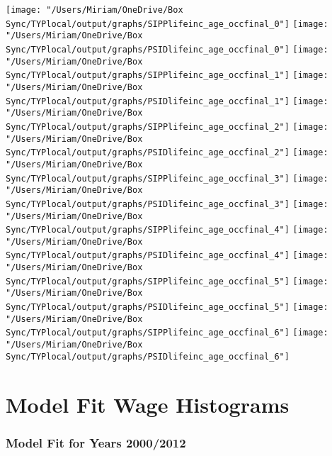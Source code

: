 \documentclass[11pt]{article}
\begin{document}
\begin{center}
\clearpage
\texttt{[image: "/Users/Miriam/OneDrive/Box Sync/TYPlocal/output/graphs/SIPPlifeinc\_age\_occfinal\_0"]}
\newline
\texttt{[image: "/Users/Miriam/OneDrive/Box Sync/TYPlocal/output/graphs/PSIDlifeinc\_age\_occfinal\_0"]}
\clearpage
\texttt{[image: "/Users/Miriam/OneDrive/Box Sync/TYPlocal/output/graphs/SIPPlifeinc\_age\_occfinal\_1"]}
\newline
\texttt{[image: "/Users/Miriam/OneDrive/Box Sync/TYPlocal/output/graphs/PSIDlifeinc\_age\_occfinal\_1"]}
\clearpage
\texttt{[image: "/Users/Miriam/OneDrive/Box Sync/TYPlocal/output/graphs/SIPPlifeinc\_age\_occfinal\_2"]}
\newline
\texttt{[image: "/Users/Miriam/OneDrive/Box Sync/TYPlocal/output/graphs/PSIDlifeinc\_age\_occfinal\_2"]}
\clearpage
\texttt{[image: "/Users/Miriam/OneDrive/Box Sync/TYPlocal/output/graphs/SIPPlifeinc\_age\_occfinal\_3"]}
\newline
\texttt{[image: "/Users/Miriam/OneDrive/Box Sync/TYPlocal/output/graphs/PSIDlifeinc\_age\_occfinal\_3"]}
\clearpage
\texttt{[image: "/Users/Miriam/OneDrive/Box Sync/TYPlocal/output/graphs/SIPPlifeinc\_age\_occfinal\_4"]}
\newline
\texttt{[image: "/Users/Miriam/OneDrive/Box Sync/TYPlocal/output/graphs/PSIDlifeinc\_age\_occfinal\_4"]}
\clearpage
\texttt{[image: "/Users/Miriam/OneDrive/Box Sync/TYPlocal/output/graphs/SIPPlifeinc\_age\_occfinal\_5"]}
\newline
\texttt{[image: "/Users/Miriam/OneDrive/Box Sync/TYPlocal/output/graphs/PSIDlifeinc\_age\_occfinal\_5"]}
\clearpage
\texttt{[image: "/Users/Miriam/OneDrive/Box Sync/TYPlocal/output/graphs/SIPPlifeinc\_age\_occfinal\_6"]}
\newline
\texttt{[image: "/Users/Miriam/OneDrive/Box Sync/TYPlocal/output/graphs/PSIDlifeinc\_age\_occfinal\_6"]}
\clearpage
\end{center}



\section{Model Fit Wage Histograms}
\subsubsection{Model Fit for Years 2000/2012}
\end{document}
